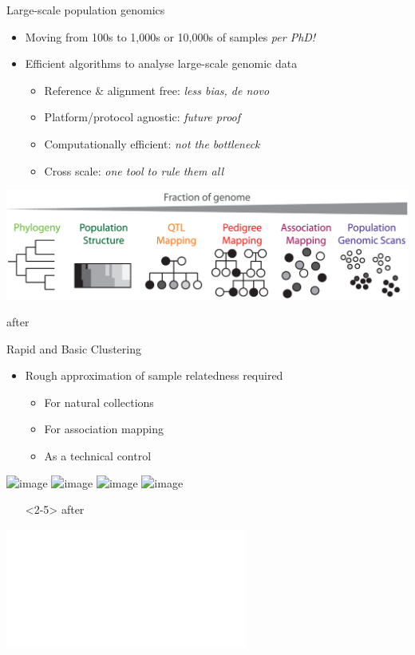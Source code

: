 \documentclass[t]{beamer}
\begin{document}
\begin{frame}{Large-scale population genomics}
  \begin{itemize}
    \item Moving from 100s to 1,000s or 10,000s of samples \textit{per PhD!}
      \pause
    \item Efficient algorithms to analyse large-scale genomic data
    \begin{itemize}
      \item Reference \& alignment free: \textit{less bias, de novo}
      \item Platform/protocol agnostic: \textit{future proof}
      \item Computationally efficient: \textit{not the bottleneck}
      \item Cross scale: \textit{one tool to rule them all}
    \end{itemize}
  \end{itemize}
  \begin{center}
    \includegraphics[width=\textwidth]{img/cross-scale.png}
  \end{center}
  \tiny{after \textcite{peterson_double_2012}}
\end{frame}


\begin{frame}{Rapid and Basic Clustering}
  \begin{itemize}
    \item Rough approximation of sample relatedness required
      \begin{itemize}
        \item For natural collections
        \item For association mapping
        \item As a technical control
      \end{itemize}
  \end{itemize}
  \pause
  \begin{center}
    \includegraphics<2>[width=\textwidth]{img/restruct-1}
    \includegraphics<3>[width=\textwidth]{img/restruct-2}
    \includegraphics<4>[width=\textwidth]{img/restruct-3}
    \includegraphics<5>[width=\textwidth]{img/restruct-4}
    \begin{itemize}
      \item[]<2-5> \tiny{after \textcite{brachi_genome-wide_2011}}
    \end{itemize}
    \includegraphics<6>[width=\textwidth]{img/jared-tree.pdf}
  \end{center}
\end{frame}
\end{document}
